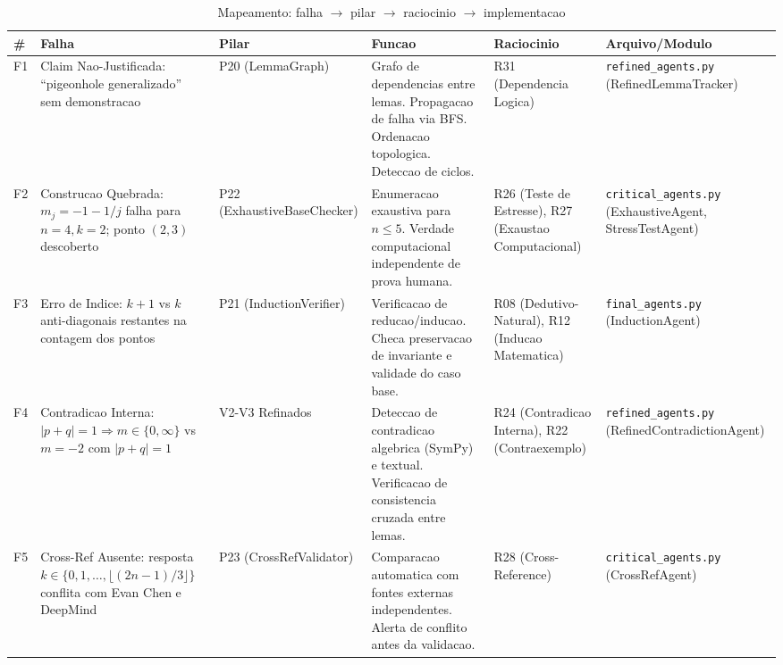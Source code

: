 \documentclass[5p]{elsarticle}
\begin{document}
\begin{landscape}
\begin{table}[H]
  \centering
  \caption{Mapeamento: falha $\to$ pilar $\to$ raciocinio $\to$ implementacao}
  \label{tab:map}
  \small
  \begin{tabular}{p{0.6cm}p{2.8cm}p{2.5cm}p{5cm}p{2.5cm}p{2.5cm}}
    \toprule
    \textbf{\#} & \textbf{Falha} & \textbf{Pilar} & \textbf{Funcao} & \textbf{Raciocinio} & \textbf{Arquivo/Modulo} \\
    \midrule
    F1 & Claim Nao-Justificada: ``pigeonhole generalizado'' sem demonstracao & P20 (LemmaGraph) & Grafo de dependencias entre lemas. Propagacao de falha via BFS. Ordenacao topologica. Deteccao de ciclos. & R31 (Dependencia Logica) & \texttt{refined\_agents.py} (RefinedLemmaTracker) \\
    \rowcolor{yellowbg}
    F2 & Construcao Quebrada: $m_j=-1-1/j$ falha para $n=4,k=2$; ponto $(2,3)$ descoberto & P22 (ExhaustiveBaseChecker) & Enumeracao exaustiva para $n\leq 5$. Verdade computacional independente de prova humana. & R26 (Teste de Estresse), R27 (Exaustao Computacional) & \texttt{critical\_agents.py} (ExhaustiveAgent, StressTestAgent) \\
    F3 & Erro de Indice: $k+1$ vs $k$ anti-diagonais restantes na contagem dos pontos & P21 (InductionVerifier) & Verificacao de reducao/inducao. Checa preservacao de invariante e validade do caso base. & R08 (Dedutivo-Natural), R12 (Inducao Matematica) & \texttt{final\_agents.py} (InductionAgent) \\
    \rowcolor{yellowbg}
    F4 & Contradicao Interna: $|p+q|=1\Rightarrow m\in\{0,\infty\}$ vs $m=-2$ com $|p+q|=1$ & V2-V3 Refinados & Deteccao de contradicao algebrica (SymPy) e textual. Verificacao de consistencia cruzada entre lemas. & R24 (Contradicao Interna), R22 (Contraexemplo) & \texttt{refined\_agents.py} (RefinedContradictionAgent) \\
    F5 & Cross-Ref Ausente: resposta $k\in\{0,1,\dots,\lfloor(2n-1)/3\rfloor\}$ conflita com Evan Chen e DeepMind & P23 (CrossRefValidator) & Comparacao automatica com fontes externas independentes. Alerta de conflito antes da validacao. & R28 (Cross-Reference) & \texttt{critical\_agents.py} (CrossRefAgent) \\
    \bottomrule
  \end{tabular}
\end{table}
\end{landscape}

\end{document}
